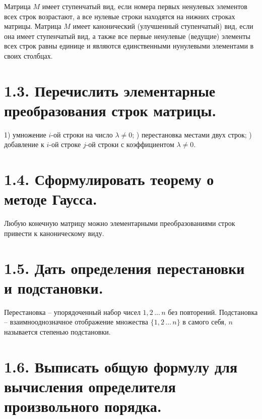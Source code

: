 \documentclass{article}
\begin{document}
Матрица $M$ имеет ступенчатый вид, если номера первых ненулевых элементов всех строк возрастают, а все нулевые строки находятся на нижних строках матрицы.
\newline Матрица $M$ имеет канонический (улучшенный ступенчатый) вид, если она имеет ступенчатый вид, а также все первые ненулевые (ведущие) элементы всех строк равны единице и являются единственными нунулевыми элементами в своих столбцах.

\section*{\LARGE 1.3. Перечислить элементарные преобразования строк матрицы. }

1) умножение $i$-ой строки на число $\lambda \ne 0$;
) перестановка местами двух строк;
) добавление к $i$-ой строке $j$-ой строки с коэффициентом $\lambda \ne 0$.

\section*{\LARGE 1.4. Сформулировать теорему о методе Гаусса.  }

Любую конечную матрицу можно элементарными преобразованиями строк привести к каноническому виду.

\section*{\LARGE 1.5. Дать определения перестановки и подстановки.  }

Перестановка -- упорядоченный набор чисел $1, 2 \,...\, n$ без повторений.
\newline Подстановка -- взаимнооднозначное отображение множества $\{1, 2 \,...\, n\}$ в самого себя, $n$ называется степенью подстановки.

\section*{\LARGE 1.6. Выписать общую формулу для вычисления определителя произвольного порядка.  }
\end{document}

